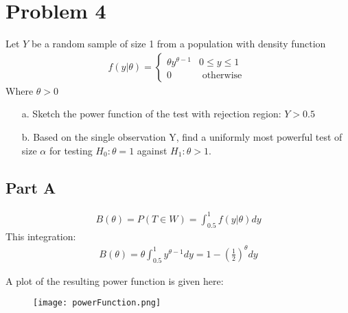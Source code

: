 \documentclass{article}
\begin{document}
\clearpage
\section*{Problem 4}
Let $Y$ be a random sample of size 1 from a population with density function
\begin{align*}
f(y|\theta) =
\begin{cases} 
      \theta y^{\theta-1} & 0 \leq y \leq 1 \\
      0 & \text{ otherwise  }
   \end{cases}
\end{align*}
Where $\theta > 0$
\begin{enumerate}
\item[a.] Sketch the power function of the test with rejection region: $Y>0.5$
\item[b.] Based on the single observation Y, find a uniformly most powerful test of size $\alpha$ for testing $H_0:\theta = 1$ against $H_1: \theta > 1$.
\end{enumerate}
\subsection*{Part A}
\begin{align*}
B(\theta) = P(T \in W) = \int_{0.5}^{1} f(y|\theta) dy
\end{align*}
This integration:
\begin{align*}
\boxed{ B(\theta) = \theta \int_{0.5}^{1} y^{\theta - 1} dy = 1-(\frac{1}{2})^\theta dy }
\end{align*}

A plot of the resulting power function is given here:

\begin{figure}[hbt!]
\centering
\texttt{[image: powerFunction.png]}
\end{figure}
\clearpage
\end{document}
